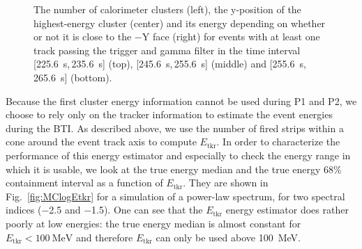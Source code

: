 \documentclass[preprint]{aastex631}
\begin{document}
\begin{figure}[t]
    \caption{The number of calorimeter clusters (left), the y-position of the highest-energy cluster (center) and its energy depending on whether or not it is close to the $-$Y face (right) for events with at least one track passing the trigger and gamma filter in the time interval [225.6~s,\,235.6~s] (top), [245.6~s,\,255.6~s] (middle) and [255.6~s,\,265.6~s] (bottom). }
    \label{fig:cal_cluster_energy}
\end{figure}

Because the first cluster energy information cannot be used during P1 and P2, we choose to rely only on the tracker information to estimate the event energies during the BTI. As described above, we use the number of fired strips within a cone around the event track axis to compute $E_\mathrm{tkr}$. In order to characterize the performance of this energy estimator and especially to check the energy range in which it is usable, we look at the true energy median and the true energy 68\% containment interval as a function of $E_\mathrm{tkr}$. They are shown in Fig.~\ref{fig:MClogEtkr} for a simulation of a power-law spectrum, for two spectral indices ($-$2.5 and $-$1.5). One can see that the $E_\mathrm{tkr}$ energy estimator does rather poorly at low energies: the true energy median is almost constant for $E_\mathrm{tkr}<100~\mathrm{MeV}$ and therefore $E_\mathrm{tkr}$ can only be used above 100~MeV.
\end{document}
